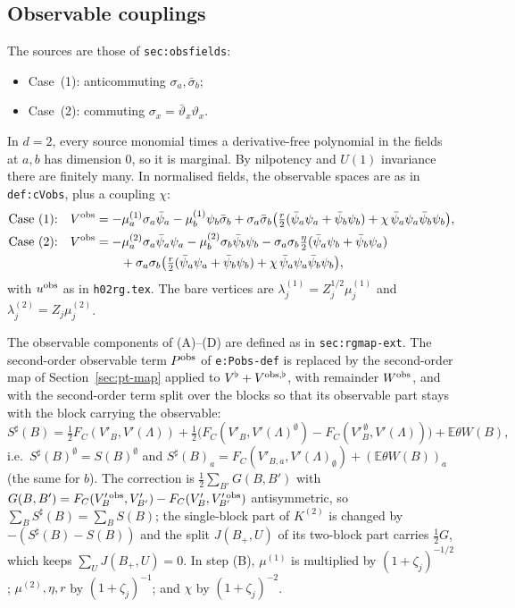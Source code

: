 \documentclass[11pt]{amsart}
\theoremstyle{definition}
\theoremstyle{remark}
\numberwithin{equation}{section}
\newcommand{\E}{\mathbb{E}}
\newcommand{\hr}{\texttt{h02rg.tex}}
\begin{document}
\subsection{Observable couplings}
The sources are those of \texttt{sec:obsfields}:
\begin{itemize}
\item Case~(1): anticommuting $\sigma_a,\bar\sigma_b$;
\item Case~(2): commuting $\sigma_x=\bar\vartheta_x\vartheta_x$.
\end{itemize}
In $d=2$, every source monomial times a derivative-free polynomial in the fields at $a,b$ has
dimension $0$, so it is marginal. By nilpotency and $U(1)$ invariance there are finitely many.
In normalised fields, the observable spaces are as in \texttt{def:cVobs}, plus a coupling $\chi$:
\begin{align*}
  \text{Case (1):}\quad V^{\rm obs}&=-\mu^{(1)}_a\sigma_a\bar\psi_a-\mu^{(1)}_b\psi_b\bar\sigma_b
  +\sigma_a\bar\sigma_b\bigl(\tfrac r2(\bar\psi_a\psi_a+\bar\psi_b\psi_b)+\chi\,\bar\psi_a\psi_a\bar\psi_b\psi_b\bigr),\\
  \text{Case (2):}\quad V^{\rm obs}&=-\mu^{(2)}_a\sigma_a\bar\psi_a\psi_a-\mu^{(2)}_b\sigma_b\bar\psi_b\psi_b
  -\sigma_a\sigma_b\tfrac\eta2(\bar\psi_a\psi_b+\bar\psi_b\psi_a)\\
  &\qquad+\sigma_a\sigma_b\bigl(\tfrac r2(\bar\psi_a\psi_a+\bar\psi_b\psi_b)+\chi\,\bar\psi_a\psi_a\bar\psi_b\psi_b\bigr),
\end{align*}
with $u^{\rm obs}$ as in \hr{}. The bare vertices are $\lambda^{(1)}_j=Z_j^{1/2}\mu^{(1)}_j$ and
$\lambda^{(2)}_j=Z_j\mu^{(2)}_j$.

The observable components of (A)--(D) are defined as in \texttt{sec:rgmap-ext}. The second-order
observable term $P^{\rm obs}$ of \texttt{e:Pobs-def} is replaced by the second-order map of
Section~\ref{sec:pt-map} applied to $V^\flat+V^{\rm obs,\flat}$, with remainder $W^{\rm obs}$, and with the
second-order term split over the blocks so that its observable part stays with the block carrying the observable:
\[S^\sharp(B)=\tfrac12F_C(V'_B,V'(\Lambda))+\tfrac12\bigl(F_C(V'_B,V'(\Lambda)^\emptyset)-F_C(V'^{\,\emptyset}_B,V'(\Lambda))\bigr)
  +\E\theta W(B),\]
i.e.\ $S^\sharp(B)^\emptyset=S(B)^\emptyset$ and $S^\sharp(B)_a=F_C(V'_{B,a},V'(\Lambda)_\emptyset)+(\E\theta W(B))_a$ (the same
for $b$). The correction is $\frac12\sum_{B'}G(B,B')$ with $G(B,B')=F_C(V'^{\,\rm obs}_B,V'_{B'})-F_C(V'_B,V'^{\,\rm obs}_{B'})$
antisymmetric, so $\sum_BS^\sharp(B)=\sum_BS(B)$; the single-block part of $K^{(2)}$ is changed by $-(S^\sharp(B)-S(B))$
and the split $J(B_+,U)$ of its two-block part carries $\frac12G$, which keeps $\sum_UJ(B_+,U)=0$. In step
(B), $\mu^{(1)}$ is multiplied by $(1+\zeta_j)^{-1/2}$; $\mu^{(2)},\eta,r$ by $(1+\zeta_j)^{-1}$;
and $\chi$ by $(1+\zeta_j)^{-2}$.
\end{document}
